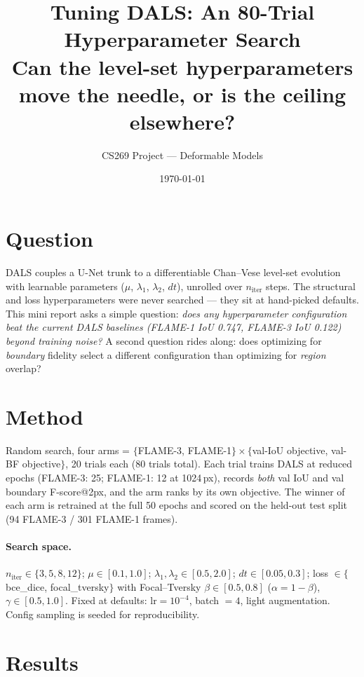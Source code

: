 \documentclass[10pt]{article}
\title{\vspace{-2.5em}Tuning DALS: An 80-Trial Hyperparameter Search\\
\large Can the level-set hyperparameters move the needle, or is the ceiling elsewhere?}
\author{CS269 Project --- Deformable Models}
\date{\today}
\begin{document}
\maketitle
\vspace{-1.5em}

\section{Question}

DALS couples a U-Net trunk to a differentiable Chan--Vese level-set evolution
with learnable parameters ($\mu$, $\lambda_1$, $\lambda_2$, $dt$), unrolled over
$n_{\text{iter}}$ steps. The structural and loss hyperparameters were never
searched --- they sit at hand-picked defaults. This mini report asks a simple
question: \emph{does any hyperparameter configuration beat the current DALS
baselines (FLAME-1 IoU 0.747, FLAME-3 IoU 0.122) beyond training noise?} A second
question rides along: does optimizing for \emph{boundary} fidelity select a
different configuration than optimizing for \emph{region} overlap?

\section{Method}

Random search, four arms = $\{$FLAME-3, FLAME-1$\} \times \{$val-IoU objective,
val-BF objective$\}$, 20 trials each (80 trials total). Each trial trains DALS at
reduced epochs (FLAME-3: 25; FLAME-1: 12 at 1024\,px), records \emph{both} val IoU
and val boundary F-score@2px, and the arm ranks by its own objective. The winner
of each arm is retrained at the full 50 epochs and scored on the held-out test
split (94 FLAME-3 / 301 FLAME-1 frames).

\paragraph{Search space.} $n_{\text{iter}}\!\in\!\{3,5,8,12\}$;
$\mu\!\in\![0.1,1.0]$; $\lambda_1,\lambda_2\!\in\![0.5,2.0]$;
$dt\!\in\![0.05,0.3]$; loss $\in\{$bce\_dice, focal\_tversky$\}$ with Focal--Tversky
$\beta\!\in\![0.5,0.8]$ ($\alpha\!=\!1\!-\!\beta$), $\gamma\!\in\![0.5,1.0]$.
Fixed at defaults: $\text{lr}=10^{-4}$, batch $=4$, light augmentation. Config
sampling is seeded for reproducibility.

\section{Results}
\end{document}
